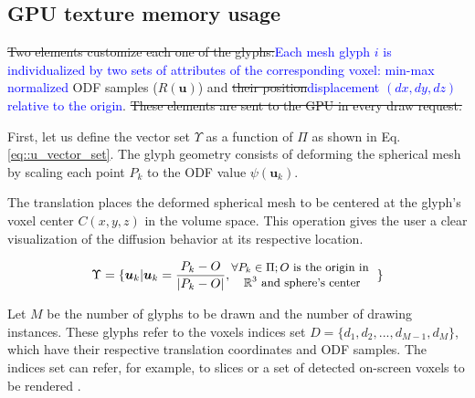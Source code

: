 \documentclass[twoside,twocolumn,10pt]{article}
\begin{document}
\subsection{GPU texture memory usage}
\label{ssec::datastruct}

\sout{Two elements customize each one of the glyphs:}\textcolor{blue}{Each mesh glyph $i$ is individualized by two sets of attributes of the corresponding voxel:} \textcolor{blue}{min-max normalized} ODF samples ($R(\bm{u})$) and \sout{their position}\textcolor{blue}{displacement $(dx, dy, dz)$ relative to the origin}. \sout{These elements are sent to the GPU in every draw request.}

First, let us define the vector set $\Upsilon$ as a function of $\Pi$ as shown in Eq. \ref{eq::u_vector_set}. The glyph geometry consists of deforming the spherical mesh by scaling each point $P_k$ to the ODF value $\psi(\bm{u}_k)$.

The translation places the deformed spherical mesh to be centered at the glyph's voxel center $C(x, y, z)$ in the volume space. This operation gives the user a clear visualization of the diffusion behavior at its respective location.

\begin{equation}
\label{eq::u_vector_set}
\Upsilon = \{\bm{u}_k | \bm{u}_k = \frac{P_k - O}{|P_k - O|}, 
\begin{tabular}{@{}c@{}}
\small{$\forall P_k \in \Pi; O$ is the origin in } \\
\small{$\mathbb{R}^3$ and sphere's center}



\end{tabular}
\text{ }\}
\end{equation}




Let $M$ be the number of glyphs to be drawn and the number of drawing instances. These glyphs refer to the voxels indices set $D = \{d_1, d_2, ..., d_{M-1}, d_M\}$, which have their respective translation coordinates and ODF samples. The indices set can refer, for example, to slices or a set of detected on-screen voxels to be rendered \cite{voltoline2021}.
\end{document}
